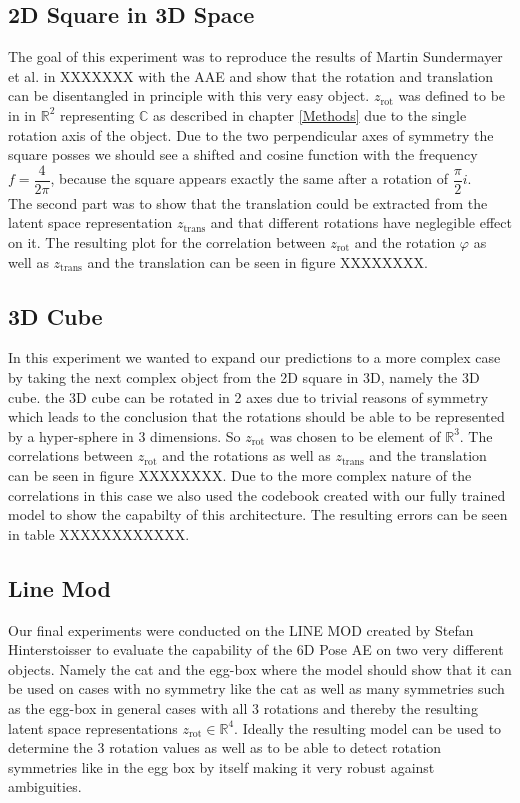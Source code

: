 \documentclass[10pt,a4paper]{article}
\newcommand{\rot}{\ensuremath{\text{rot}\xspace}}
\newcommand{\trans}{\ensuremath{\text{trans}\xspace}}
\begin{document}
\subsection{2D Square in 3D Space}\label{Square}
The goal of this experiment was to reproduce the results of Martin Sundermayer et al. in XXXXXXX with the AAE and show that the rotation and translation can be disentangled in principle with this very easy object. $z_{\rot}$ was defined to be in in $\mathbb{R}^2$ representing $\mathbb{C}$ as described in chapter \ref{Methods} due to the single rotation axis of the object. Due to the two perpendicular axes of symmetry the square posses we should see a shifted and cosine function with the frequency $f = \dfrac{4}{2 \pi}$, because the square appears exactly the same after a rotation of $\dfrac{\pi}{2}i$. \\
The second part was to show that the translation could be extracted from the latent space representation $z_{\trans}$ and that different rotations have neglegible effect on it. The resulting plot for the correlation between $z_{\rot}$ and the rotation $\varphi$ as well as $z_{\trans}$ and the translation can be seen in figure XXXXXXXX.
\newpage
\subsection{3D Cube}\label{Cube}
In this experiment we wanted to expand our predictions to a more complex case by taking the next complex object from the 2D square in 3D, namely the 3D cube. the 3D cube can be rotated in 2 axes due to trivial reasons of symmetry which leads to the conclusion that the rotations should be able to be represented by a hyper-sphere in 3 dimensions. So $z_{\rot}$ was chosen to be element of $\mathbb{R}^3$. The correlations between $z_{\rot}$ and the rotations as well as $z_{\trans}$ and the translation can be seen in figure XXXXXXXX.
Due to the more complex nature of the correlations in this case we also used the codebook created with our fully trained model to show the capabilty of this architecture. The resulting errors can be seen in table XXXXXXXXXXXX.
\newpage
\subsection{Line Mod}
Our final experiments were conducted on the LINE MOD created by Stefan Hinterstoisser \cite{LINEMOD} to evaluate the capability of the 6D Pose AE on two very different objects. Namely the cat and the egg-box where the model should show that it can be used on cases with no symmetry like the cat as well as many symmetries such as the egg-box in general cases with all 3 rotations and thereby the resulting latent space representations $z_{\rot} \in \mathbb{R}^4$. Ideally the resulting model can be used to determine the 3 rotation values as well as to be able to detect rotation symmetries like in the egg box by itself making it very robust against ambiguities. 
\end{document}
